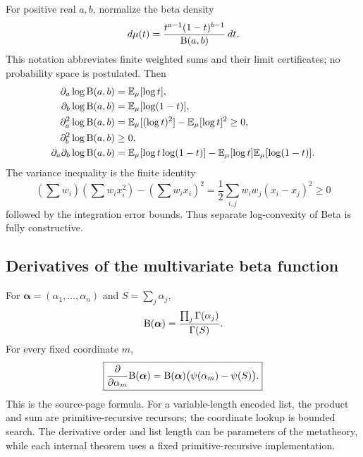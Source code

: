 For positive real $a,b$, normalize the beta density
\[
 d\mu(t)=\frac{t^{a-1}(1-t)^{b-1}}{\mathrm B(a,b)}\,dt.
\]
This notation abbreviates finite weighted sums and their limit certificates; no probability space is postulated.  Then
\begin{align*}
 \partial_a\log\mathrm B(a,b)&=\mathbb E_\mu[\log t],\\
 \partial_b\log\mathrm B(a,b)&=\mathbb E_\mu[\log(1-t)],\\
 \partial_a^2\log\mathrm B(a,b)&=
 \mathbb E_\mu[(\log t)^2]
 -\mathbb E_\mu[\log t]^2\ge0,\\
 \partial_b^2\log\mathrm B(a,b)&\ge0,\\
 \partial_a\partial_b\log\mathrm B(a,b)&=
 \mathbb E_\mu[\log t\log(1-t)]
 -\mathbb E_\mu[\log t]\mathbb E_\mu[\log(1-t)].
\end{align*}
The variance inequality is the finite identity
\[
 \left(\sum w_i\right)\left(\sum w_i x_i^2\right)
 -\left(\sum w_i x_i\right)^2
 =\frac12\sum_{i,j}w_iw_j(x_i-x_j)^2\ge0
\]
followed by the integration error bounds.  Thus separate log-convexity of Beta is fully constructive.

\subsection{Derivatives of the multivariate beta function}

For $\boldsymbol\alpha=(\alpha_1,\dots,\alpha_n)$ and
$S=\sum_j\alpha_j$,
\[
 \mathrm B(\boldsymbol\alpha)
 =\frac{\prod_j\Gamma(\alpha_j)}{\Gamma(S)}.
\]
For every fixed coordinate $m$,
\begin{equation}
 \boxed{
 \frac{\partial}{\partial\alpha_m}\mathrm B(\boldsymbol\alpha)
 =\mathrm B(\boldsymbol\alpha)
 \bigl(\psi(\alpha_m)-\psi(S)\bigr).}
 \label{eq:multibeta-derivative}
\end{equation}
This is the source-page formula.  For a variable-length encoded list, the product and sum are primitive-recursive recursors; the coordinate lookup is bounded search.  The derivative order and list length can be parameters of the metatheory, while each internal theorem uses a fixed primitive-recursive implementation.
